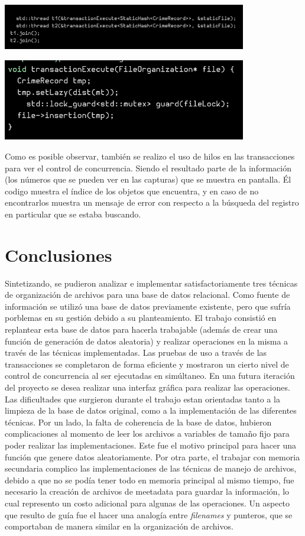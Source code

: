 \documentclass{article}
\begin{document}
    \includegraphics[width = 0.8\textwidth]{image2}

    \includegraphics[width = 0.8\textwidth]{image3}

   Como es posible observar, también se realizo el uso de hilos en las transacciones para ver el control de concurrencia. Siendo el resultado parte de la información (los números que se pueden ver en las capturas) que se muestra en pantalla. Él codigo muestra el índice de los objetos que encuentra, y en caso de no encontrarlos muestra un mensaje de error con respecto a la búsqueda del registro en particular que se estaba buscando.

  \section{Conclusiones}
    
    Sintetizando, se pudieron analizar e implementar satisfactoriamente tres técnicas de organización de archivos para una base de datos relacional. Como fuente de información se utilizó una base de datos previamente existente, pero que sufría porblemas en su gestión debido a su planteamiento. El trabajo consistió en replantear esta base de datos para hacerla trabajable (además de crear una función de generación de datos aleatoria) y realizar operaciones en la misma a través de las técnicas implementadas. Las pruebas de uso a través de las transacciones se completaron de forma eficiente y mostraron un cierto nivel de control de concurrencia al ser ejecutadas en simúltaneo. En una futura iteración del proyecto se desea realizar una interfaz gráfica para realizar las operaciones. \\

    Las dificultades que surgieron durante el trabajo estan orientadas tanto a la limpieza de la base de datos original, como a la implementación de las diferentes técnicas. Por un lado, la falta de coherencia de la base de datos, hubieron complicaciones al momento de leer los archivos a variables de tamaño fijo para poder realizar las implementaciones. Este fue el motivo principal para hacer una función que genere datos aleatoriamente. Por otra parte, el trabajar con memoria secundaria complico las implementaciones de las técnicas de manejo de archivos, debido a que no se podía tener todo en memoria principal al mismo tiempo, fue necesario la creación de archivos de meetadata para guardar la información, lo cual represento un costo adicional para algunas de las operaciones. Un aspecto que resulto de guía fue el hacer una analogía entre \textit{filenames} y punteros, que se comportaban de manera similar en la organización de archivos. 
  
\end{document}

